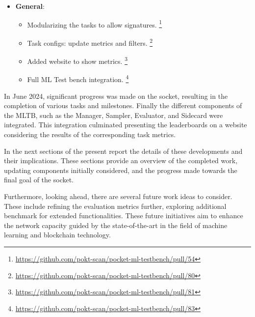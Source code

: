 \begin{itemize}[noitemsep]
\begin{itemize}[noitemsep]
\begin{itemize}[noitemsep]
                \item Added endpoint for tokenizer in llm nodes. \footnote{\url{https://github.com/pokt-scan/pocket-ml-testbench/pull/56}}                
            \end{itemize}
        \item \textbf{General}:
            \begin{itemize}[noitemsep]
                \item Modularizing the tasks to allow signatures. \footnote{\url{https://github.com/pokt-scan/pocket-ml-testbench/pull/54}}
                \item Task configs: update metrics and filters. \footnote{\url{https://github.com/pokt-scan/pocket-ml-testbench/pull/80}}
                \item Added website to show metrics. \footnote{\url{https://github.com/pokt-scan/pocket-ml-testbench/pull/81}}
                \item Full ML Test bench integration. \footnote{\url{https://github.com/pokt-scan/pocket-ml-testbench/pull/83}}            
            \end{itemize}
    \end{itemize}
\end{itemize}

In June 2024, significant progress was made on the socket, resulting in the completion of various tasks and milestones. 
Finally the different components of the \gls{MLTB}, such as the Manager, Sampler, Evaluator, and Sidecard were integrated. 
This integration culminated presenting the leaderboards on a website considering the results of the corresponding task metrics.

In the next sections of the present report the details of these developments and their implications. 
These sections provide an overview of the completed work, updating components initially considered, and the progress made towards the final goal of the socket.

Furthermore, looking ahead, there are several future work ideas to consider. 
These include refining the evaluation metrics further, exploring additional benchmark for extended functionalities. 
These future initiatives aim to enhance the network capacity guided by the state-of-the-art in the field of machine learning and blockchain technology.


